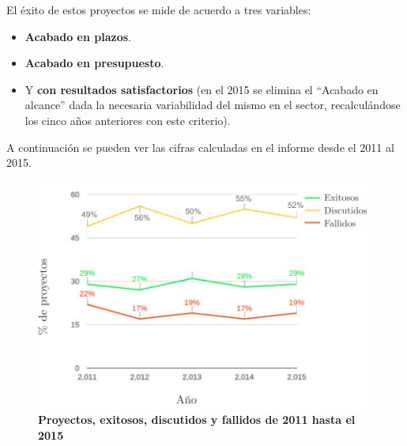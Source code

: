 El éxito de estos proyectos se mide de acuerdo a tres variables:

\begin{itemize}
    \item \textbf{Acabado en plazos}.
    \item \textbf{Acabado en presupuesto}.
    \item Y \textbf{con resultados satisfactorios} (en el 2015 se elimina el ``Acabado en alcance” dada la necesaria variabilidad del mismo en el sector, recalculándose los cinco años anteriores con este criterio).
\end{itemize}

A continuación se pueden ver las cifras calculadas en el informe desde el 2011 al 2015.

  

\begin{figure}[h]
\includegraphics[width=11cm]{Img/Desarrollo/caos0.png}
\centering
\caption{\textbf{ \footnotesize{Proyectos, exitosos, discutidos y fallidos de 2011 hasta el 2015}}}
\label{fig:caos0}
\end{figure}

